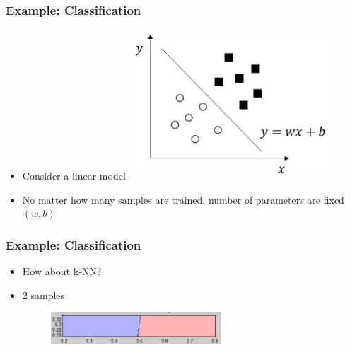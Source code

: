 \documentclass{beamer}
\begin{document}
\begin{frame}
	\frametitle{Example: Classification}
	\begin{itemize}
		\item{Consider a linear model}
		\includegraphics[width=0.6\textwidth]{img/linear.png}
		\item{No matter how many samples are trained, number of parameters are fixed $(w,b)$}
	\end{itemize}
\end{frame}

\begin{frame}
	\frametitle{Example: Classification}
	\begin{itemize}
		\item{How about k-NN?}
		\item 2 samples
		\begin{figure}	
		\includegraphics[width=0.6\textwidth]{img/knn2.png}
		\end{figure}
	\end{itemize}
\end{frame}
\end{document}
